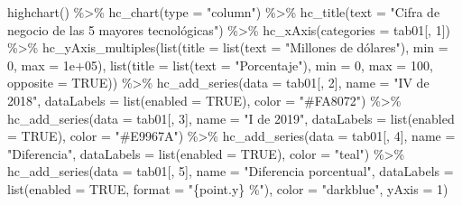 \documentclass[
]{book}
\newenvironment{Shaded}{\begin{snugshade}}{\end{snugshade}}
\newcommand{\AttributeTok}[1]{\textcolor[rgb]{0.77,0.63,0.00}{#1}}
\newcommand{\ConstantTok}[1]{\textcolor[rgb]{0.00,0.00,0.00}{#1}}
\newcommand{\DecValTok}[1]{\textcolor[rgb]{0.00,0.00,0.81}{#1}}
\newcommand{\FloatTok}[1]{\textcolor[rgb]{0.00,0.00,0.81}{#1}}
\newcommand{\FunctionTok}[1]{\textcolor[rgb]{0.00,0.00,0.00}{#1}}
\newcommand{\NormalTok}[1]{#1}
\newcommand{\SpecialCharTok}[1]{\textcolor[rgb]{0.00,0.00,0.00}{#1}}
\newcommand{\StringTok}[1]{\textcolor[rgb]{0.31,0.60,0.02}{#1}}
\begin{document}
\begin{Shaded}
\begin{Highlighting}[]
\FunctionTok{highchart}\NormalTok{() }\SpecialCharTok{\%\textgreater{}\%}
  \FunctionTok{hc\_chart}\NormalTok{(}\AttributeTok{type =} \StringTok{"column"}\NormalTok{) }\SpecialCharTok{\%\textgreater{}\%}
  \FunctionTok{hc\_title}\NormalTok{(}\AttributeTok{text =} \StringTok{"Cifra de negocio de las 5 mayores tecnológicas"}\NormalTok{) }\SpecialCharTok{\%\textgreater{}\%}
  \FunctionTok{hc\_xAxis}\NormalTok{(}\AttributeTok{categories =}\NormalTok{ tab01[, }\DecValTok{1}\NormalTok{]) }\SpecialCharTok{\%\textgreater{}\%}
  \FunctionTok{hc\_yAxis\_multiples}\NormalTok{(}\FunctionTok{list}\NormalTok{(}\AttributeTok{title =} \FunctionTok{list}\NormalTok{(}\AttributeTok{text =} \StringTok{"Millones de dólares"}\NormalTok{),}
    \AttributeTok{min =} \DecValTok{0}\NormalTok{, }\AttributeTok{max =} \FloatTok{1e+05}\NormalTok{), }\FunctionTok{list}\NormalTok{(}\AttributeTok{title =} \FunctionTok{list}\NormalTok{(}\AttributeTok{text =} \StringTok{"Porcentaje"}\NormalTok{),}
    \AttributeTok{min =} \DecValTok{0}\NormalTok{, }\AttributeTok{max =} \DecValTok{100}\NormalTok{, }\AttributeTok{opposite =} \ConstantTok{TRUE}\NormalTok{)) }\SpecialCharTok{\%\textgreater{}\%}
  \FunctionTok{hc\_add\_series}\NormalTok{(}\AttributeTok{data =}\NormalTok{ tab01[, }\DecValTok{2}\NormalTok{], }\AttributeTok{name =} \StringTok{"IV de 2018"}\NormalTok{,}
    \AttributeTok{dataLabels =} \FunctionTok{list}\NormalTok{(}\AttributeTok{enabled =} \ConstantTok{TRUE}\NormalTok{), }\AttributeTok{color =} \StringTok{"\#FA8072"}\NormalTok{) }\SpecialCharTok{\%\textgreater{}\%}
  \FunctionTok{hc\_add\_series}\NormalTok{(}\AttributeTok{data =}\NormalTok{ tab01[, }\DecValTok{3}\NormalTok{], }\AttributeTok{name =} \StringTok{"I de 2019"}\NormalTok{,}
    \AttributeTok{dataLabels =} \FunctionTok{list}\NormalTok{(}\AttributeTok{enabled =} \ConstantTok{TRUE}\NormalTok{), }\AttributeTok{color =} \StringTok{"\#E9967A"}\NormalTok{) }\SpecialCharTok{\%\textgreater{}\%}
  \FunctionTok{hc\_add\_series}\NormalTok{(}\AttributeTok{data =}\NormalTok{ tab01[, }\DecValTok{4}\NormalTok{], }\AttributeTok{name =} \StringTok{"Diferencia"}\NormalTok{,}
    \AttributeTok{dataLabels =} \FunctionTok{list}\NormalTok{(}\AttributeTok{enabled =} \ConstantTok{TRUE}\NormalTok{), }\AttributeTok{color =} \StringTok{"teal"}\NormalTok{) }\SpecialCharTok{\%\textgreater{}\%}
  \FunctionTok{hc\_add\_series}\NormalTok{(}\AttributeTok{data =}\NormalTok{ tab01[, }\DecValTok{5}\NormalTok{], }\AttributeTok{name =} \StringTok{"Diferencia porcentual"}\NormalTok{,}
    \AttributeTok{dataLabels =} \FunctionTok{list}\NormalTok{(}\AttributeTok{enabled =} \ConstantTok{TRUE}\NormalTok{, }\AttributeTok{format =} \StringTok{"\{point.y\} \%"}\NormalTok{),}
    \AttributeTok{color =} \StringTok{"darkblue"}\NormalTok{, }\AttributeTok{yAxis =} \DecValTok{1}\NormalTok{)}
\end{Highlighting}
\end{Shaded}
\end{document}

